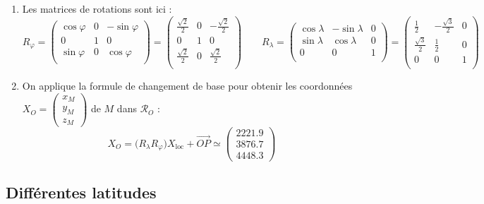 \documentclass[class=report,crop=false]{standalone}
\newcommand{\vect}{\overrightarrow}
\begin{document}
\begin{exemple}
\begin{enumerate}
  
  \item Les matrices de rotations sont ici :
 $$R_\varphi = 
\begin{pmatrix}
\cos \varphi & 0 & -\sin \varphi \\
0            & 1 & 0 \\
\sin \varphi & 0 & \cos \varphi \\
\end{pmatrix}
=
\begin{pmatrix}
\frac{\sqrt2}{2} & 0 & -\frac{\sqrt2}{2} \\
0                & 1 & 0 \\
\frac{\sqrt2}{2} & 0 & \frac{\sqrt2}{2} \\
\end{pmatrix}
\qquad R_\lambda = 
\begin{pmatrix}
\cos \lambda & -\sin \lambda & 0 \\
\sin \lambda & \cos \lambda  & 0 \\
0            & 0             & 1 \\
\end{pmatrix} = 
\begin{pmatrix}
\frac12          & -\frac{\sqrt3}{2} & 0 \\
\frac{\sqrt3}{2} & \frac12           & 0 \\
0                & 0                 & 1 \\
\end{pmatrix}$$ 
  
  
  \item On applique la formule de changement de base pour obtenir les coordonnées
  $X_O =\left(\begin{smallmatrix}x_M\\y_M\\z_M\end{smallmatrix}\right)$ 
  de $M$ dans $\mathcal{R}_O$ :
  $$X_O =\big(R_\lambda R_\varphi\big) X_{\text{loc}} + \vect{OP} 
  \simeq \begin{pmatrix}\num{2221.9}\\\num{3876.7}\\\num{4448.3}\end{pmatrix}$$
\end{enumerate}
\end{exemple}


\subsection{Différentes latitudes}
\end{document}
